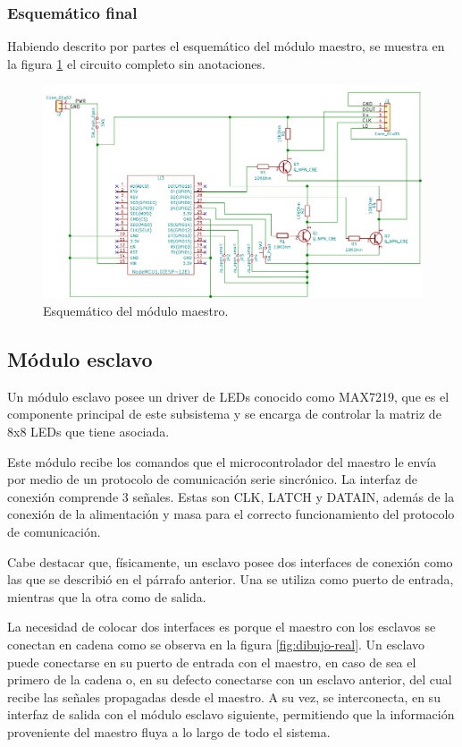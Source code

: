 \subsubsection{Esquemático final}
Habiendo descrito por partes el esquemático del módulo maestro, se muestra en la figura \ref{fig:esquematico-master} el circuito completo sin anotaciones.

\begin{figure}[ht!]
	\centering
	\includegraphics[width=\linewidth]{imagenes/esquematico-master.pdf}
	\caption{Esquemático del módulo maestro.}
	\label{fig:esquematico-master}
\end{figure}

\clearpage
\subsection{Módulo esclavo}
Un módulo esclavo posee un driver de LEDs conocido como MAX7219, que es el componente principal de este subsistema y se encarga de controlar la matriz de 8x8 LEDs que tiene asociada.

Este módulo recibe los comandos que el microcontrolador del maestro le envía por medio de un protocolo de comunicación serie sincrónico. La interfaz de conexión comprende 3 señales. Estas son CLK, LATCH y DATAIN, además de la conexión de la alimentación y masa para el correcto funcionamiento del protocolo de comunicación.

Cabe destacar que, físicamente, un esclavo posee dos interfaces de conexión como las que se describió en el párrafo anterior. Una se utiliza como puerto de entrada, mientras que la otra como de salida.

La necesidad de colocar dos interfaces es porque el maestro con los esclavos se conectan en cadena como se observa en la figura \ref{fig:dibujo-real}.
Un esclavo puede conectarse en su puerto de entrada con el maestro, en caso de sea el primero de la cadena o, en su defecto conectarse con un esclavo anterior, del cual recibe las señales propagadas desde el maestro.
A su vez, se interconecta, en su interfaz de salida con el módulo esclavo siguiente, permitiendo que la información proveniente del maestro fluya a lo largo de todo el sistema.

